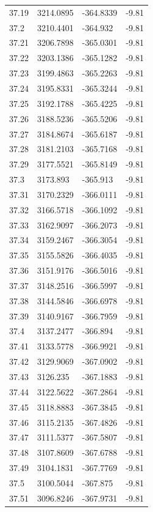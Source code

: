 \begin{table}[H]
\begin{tabular}{llll}
37.19 & 3214.0895 & -364.8339 & -9.81 \\
37.2 & 3210.4401 & -364.932 & -9.81 \\
37.21 & 3206.7898 & -365.0301 & -9.81 \\
37.22 & 3203.1386 & -365.1282 & -9.81 \\
37.23 & 3199.4863 & -365.2263 & -9.81 \\
37.24 & 3195.8331 & -365.3244 & -9.81 \\
37.25 & 3192.1788 & -365.4225 & -9.81 \\
37.26 & 3188.5236 & -365.5206 & -9.81 \\
37.27 & 3184.8674 & -365.6187 & -9.81 \\
37.28 & 3181.2103 & -365.7168 & -9.81 \\
37.29 & 3177.5521 & -365.8149 & -9.81 \\
37.3 & 3173.893 & -365.913 & -9.81 \\
37.31 & 3170.2329 & -366.0111 & -9.81 \\
37.32 & 3166.5718 & -366.1092 & -9.81 \\
37.33 & 3162.9097 & -366.2073 & -9.81 \\
37.34 & 3159.2467 & -366.3054 & -9.81 \\
37.35 & 3155.5826 & -366.4035 & -9.81 \\
37.36 & 3151.9176 & -366.5016 & -9.81 \\
37.37 & 3148.2516 & -366.5997 & -9.81 \\
37.38 & 3144.5846 & -366.6978 & -9.81 \\
37.39 & 3140.9167 & -366.7959 & -9.81 \\
37.4 & 3137.2477 & -366.894 & -9.81 \\
37.41 & 3133.5778 & -366.9921 & -9.81 \\
37.42 & 3129.9069 & -367.0902 & -9.81 \\
37.43 & 3126.235 & -367.1883 & -9.81 \\
37.44 & 3122.5622 & -367.2864 & -9.81 \\
37.45 & 3118.8883 & -367.3845 & -9.81 \\
37.46 & 3115.2135 & -367.4826 & -9.81 \\
37.47 & 3111.5377 & -367.5807 & -9.81 \\
37.48 & 3107.8609 & -367.6788 & -9.81 \\
37.49 & 3104.1831 & -367.7769 & -9.81 \\
37.5 & 3100.5044 & -367.875 & -9.81 \\
37.51 & 3096.8246 & -367.9731 & -9.81 \\

\end{tabular}
\end{table}
